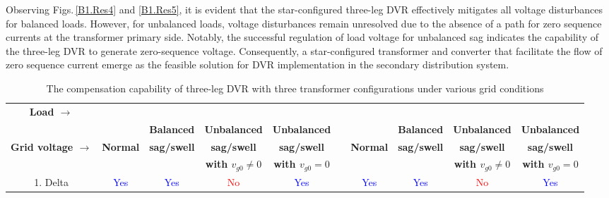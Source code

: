 Observing Figs.\,\ref{B1.Res4} and \ref{B1.Res5}, it is evident that the star-configured three-leg DVR effectively mitigates all voltage disturbances for balanced loads. However, for unbalanced loads, voltage disturbances remain unresolved due to the absence of a path for zero sequence currents at the transformer primary side. Notably, the successful regulation of load voltage for unbalanced sag indicates the capability of the three-leg DVR to generate zero-sequence voltage. Consequently, a star-configured transformer and converter that facilitate the flow of zero sequence current emerge as the feasible solution for DVR implementation in the secondary distribution system. 

\begin{table}
\centering
\caption{The compensation capability of three-leg DVR with three transformer configurations under various grid conditions}
\label{TableB1.3}
\begin{tabular}{>{\small}c>{\small}c>{\small}c>{\small}c>{\small}c>{\small}c>{\small}c>{\small}c>{\small}c>{\small}c}  
	\hline
	\hline
	\textbf{\footnotesize Load $\rightarrow$} & \multicolumn{4}{c}{\textbf{\footnotesize Balanced load}} & & \multicolumn{4}{c}{\textbf{\footnotesize Unbalanced load}} \\ \cline{2-5} \cline{7-10}
	&   & \textbf{\footnotesize Balanced} & \textbf{\footnotesize Unbalanced} & \textbf{\footnotesize Unbalanced}  & & & \textbf{\footnotesize Balanced} & \textbf{\footnotesize Unbalanced} & \textbf{\footnotesize Unbalanced} \\
	\textbf{\footnotesize Grid voltage $\rightarrow$} & \textbf{\footnotesize Normal} & \textbf{\footnotesize sag/swell} & \textbf{\footnotesize sag/swell} & \textbf{\footnotesize sag/swell}  & & \textbf{\footnotesize Normal} & \textbf{\footnotesize sag/swell} & \textbf{\footnotesize sag/swell} & \textbf{\footnotesize sag/swell} \\
	&   &  & \textbf{\footnotesize with $v_{g0} \neq 0$} & \textbf{\footnotesize with $v_{g0} = 0$}  &  &  &  & \textbf{\footnotesize with $v_{g0} \neq 0$} & \textbf{\footnotesize with $v_{g0} = 0$} \\
	\hline
	\footnotesize 1. Delta & \footnotesize \textcolor{blue}{Yes} & \footnotesize \textcolor{blue}{Yes}  & \footnotesize \textcolor{red}{No} & \footnotesize \textcolor{blue}{Yes} &  & \footnotesize \textcolor{blue}{Yes}  & \footnotesize \textcolor{blue}{Yes} & \footnotesize \textcolor{red}{No} & \footnotesize \textcolor{blue}{Yes} \\ 

\end{tabular}
\end{table}
